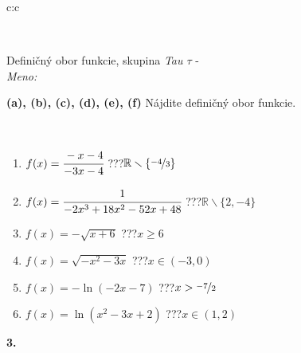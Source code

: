 \documentclass[10pt]{report}
\begin{document}
\begin{tabular}{c:c}
\begin{minipage}[c][104.5mm][t]{0.5\linewidth}
\begin{center}
\begin{minipage}{0.20\linewidth}
\begin{center}
\end{center}
\end{minipage}
\end{center}
\end{minipage}
\\ \hdashline
\begin{minipage}[c][104.5mm][t]{0.5\linewidth}
\begin{center}
\vspace{7mm}
{\huge Definičný obor funkcie, skupina \textit{Tau $\tau$} -}\\[5mm]
\textit{Meno:}\phantom{xxxxxxxxxxxxxxxxxxxxxxxxxxxxxxxxxxxxxxxxxxxxxxxxxxxxxxxxxxxxxxxxx}\\[5mm]
\begin{minipage}{0.95\linewidth}
\begin{center}
{
\textbf{(a), (b), (c), (d), (e), (f)} Nájdite definičný obor funkcie. \\[1mm]
\phantom{x}
}
\end{center}
\end{minipage}
\\[4mm]
\begin{minipage}{0.79\linewidth}
\begin{center}
\begin{varwidth}{\linewidth}
\begin{enumerate}
\normalsizerrr
\item $f(x)=\cfrac{-x-4}{-3x-4}$\quad \dotfill\; ???\;\dotfill \quad $ \mathbb{R} \smallsetminus\{\nicefrac{-4}{3} \}$
\item $f(x)=\cfrac{1}{-2x^3+18x^2-52x+48}$\quad \dotfill\; ???\;\dotfill \quad $ \mathbb{R} \smallsetminus\{2,-4 \}$
\item $f(x)=-\sqrt{x+6}$\quad \dotfill\; ???\;\dotfill \quad $x\geq6$
\item $f(x)=\sqrt{-x^2-3x}$\quad \dotfill\; ???\;\dotfill \quad $x\in(-3 , 0)$
\item $f(x)=-\ln{(-2x-7)}$\quad \dotfill\; ???\;\dotfill \quad $x>\nicefrac{-7}{2}$
\item $f(x)=\ln{(x^2-3x+2)}$\quad \dotfill\; ???\;\dotfill \quad $x\in(1 , 2)$
\end{enumerate}
\end{varwidth}
\end{center}
\end{minipage}
\begin{minipage}{0.20\linewidth}
\begin{center}
{\Huge\bfseries 3.} \\[2mm]

\end{center}
\end{minipage}
\end{center}
\end{minipage}
\end{tabular}
\end{document}
